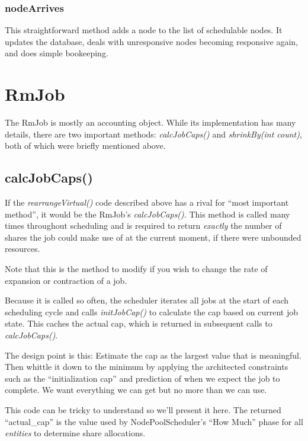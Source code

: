 \subsubsection{nodeArrives}
    This straightforward method adds a node to the list of schedulable nodes.  It updates the
    database, deals with unresponsive nodes becoming responsive again, and does
    simple bookeeping.

\section{RmJob}

    The RmJob is mostly an accounting object.  While its implementation has many details,
    there are two important methods: {\em calcJobCaps()} and {\em shrinkBy(int count)}, both
    of which were briefly mentioned above.

\subsection{calcJobCaps()}
    If the {\em rearrangeVirtual()} code described above has a rival for ``most important method'',
    it would be the RmJob's {\em calcJobCaps()}.  This method is called many times throughout
    scheduling and is required to return {\em exactly} the number of shares the job could make
    use of at the current moment, if there were unbounded resources.

    Note that this is the method to modify if you wish to change the rate of expansion or
    contraction of a job.

    Because it is called so often, the scheduler iterates all jobs at the start of each 
    scheduling cycle and calls {\em initJobCap()} to calculate the cap based on current job
    state.  This caches the actual cap, which is returned in subsequent calls to
    {\em calcJobCaps()}.

    The design point is this:  Estimate the cap as the largest value that is meaningful.  Then
    whittle it down to the minimum by applying the architected constraints such as
    the ``initialization cap'' and prediction of when we expect the job to complete.  We want
    everything we can get but no more than we can use.

    This code can be tricky to understand so we'll present it here.  The returned ``actual\_cap'' is
    the value used by NodePoolScheduler's ``How Much'' phase for all {\em entities} to determine share allocations.

